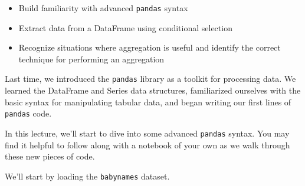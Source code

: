\documentclass[
  letterpaper,
  DIV=11,
  numbers=noendperiod]{scrreprt}
\providecommand{\tightlist}{%
  \setlength{\itemsep}{0pt}\setlength{\parskip}{0pt}}\usepackage{longtable,booktabs,array}
\begin{document}
\begin{tcolorbox}[enhanced jigsaw, rightrule=.15mm, opacityback=0, colbacktitle=quarto-callout-note-color!10!white, opacitybacktitle=0.6, coltitle=black, toptitle=1mm, colback=white, toprule=.15mm, leftrule=.75mm, breakable, bottomtitle=1mm, bottomrule=.15mm, arc=.35mm, title=\textcolor{quarto-callout-note-color}{\faInfo}\hspace{0.5em}{Note}, colframe=quarto-callout-note-color-frame, titlerule=0mm, left=2mm]

\begin{itemize}
\tightlist
\item
  Build familiarity with advanced \texttt{pandas} syntax
\item
  Extract data from a DataFrame using conditional selection
\item
  Recognize situations where aggregation is useful and identify the
  correct technique for performing an aggregation
\end{itemize}

\end{tcolorbox}

Last time, we introduced the \texttt{pandas} library as a toolkit for
processing data. We learned the DataFrame and Series data structures,
familiarized ourselves with the basic syntax for manipulating tabular
data, and began writing our first lines of \texttt{pandas} code.

In this lecture, we'll start to dive into some advanced \texttt{pandas}
syntax. You may find it helpful to follow along with a notebook of your
own as we walk through these new pieces of code.

We'll start by loading the \texttt{babynames} dataset.
\end{document}
